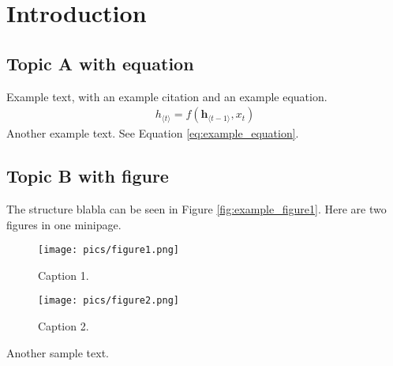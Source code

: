 \section{Introduction}

\subsection{Topic A with equation}

Example text, with an example citation \cite{paper_from_literature} and an example equation.
%
\begin{align}
h_{\langle t\rangle} = f (\textbf{h}_{\langle t-1\rangle}, x_{t}) \label{eq:example_equation}
\end{align}
%
Another example text. See Equation \eqref{eq:example_equation}.

\subsection{Topic B with figure}

The structure blabla can be seen in Figure \ref{fig:example_figure1}.
Here are two figures in one minipage.
%
\begin{figure}[!tbp]
\centering
  \begin{minipage}[b]{.45\textwidth}
  \centering
    \texttt{[image: pics/figure1.png]}
    \caption{Caption 1.}
    \label{fig:example_figure1}
	\end{minipage}
	\hfill
	\begin{minipage}[b]{.45\textwidth}
  \centering
    \texttt{[image: pics/figure2.png]}
    \caption{Caption 2.}
    \label{fig:example_figure2}
	\end{minipage}
\end{figure}
%
Another sample text.